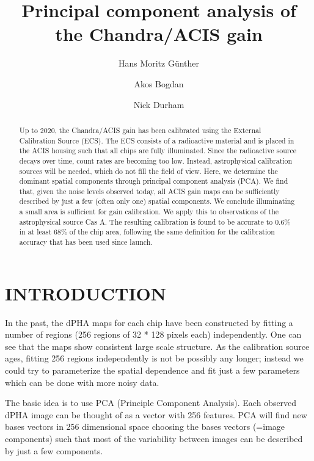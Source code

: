 \documentclass[]{spie}  %
\title{Principal component analysis of the Chandra/ACIS gain}
\author[a]{Hans Moritz G\"unther}
\author[b]{Akos Bogdan}
\author[b]{Nick Durham }
\affil[a]{MIT Kavli Institute for Astrophysics and Space Research, Massachusetts Institute of Technology, Cambridge, MA 02139, USA}
\affil[b]{Smithsonian Astrophysical Observatory, Cambridge, MA 02139, USA}
\begin{document}
 
\maketitle

\begin{abstract}
Up to 2020, the Chandra/ACIS gain has been calibrated using the External Calibration Source (ECS). The ECS consists of a radioactive material and is placed in the ACIS housing such that all chips are fully illuminated. Since the radioactive source decays over time, count rates are becoming too low. Instead, astrophysical calibration sources will be needed, which do not fill the field of view. Here, we determine the dominant spatial components through principal component analysis (PCA). We find that, given the noise levels observed today, all ACIS gain maps can be sufficiently described by just a few (often only one) spatial components. We conclude illuminating a small area is sufficient for gain calibration. We apply this to observations of the astrophysical source Cas A. The resulting calibration is found to be accurate to 0.6\% in at least 68\% of the chip area, following the same definition for the calibration accuracy that has been used since launch.
\end{abstract}



\section{INTRODUCTION}
\label{sec:intro} 

In the past, the dPHA maps for each chip have been constructed by fitting a number of regions (256 regions of 32 * 128 pixels each) independently. One can see that the maps show consistent large scale structure. As the calibration source ages, fitting 256 regions independently is not be possibly any longer; instead we could try to parameterize the spatial dependence and fit just a few parameters which can be done with more noisy data.

The basic idea is to use PCA (Principle Component Analysis). Each observed dPHA image can be thought of as a vector with 256 features. PCA will find new bases vectors in 256 dimensional space choosing the bases vectors (=image components) such that most of the variability between images can be described by just a few components.
\end{document}
